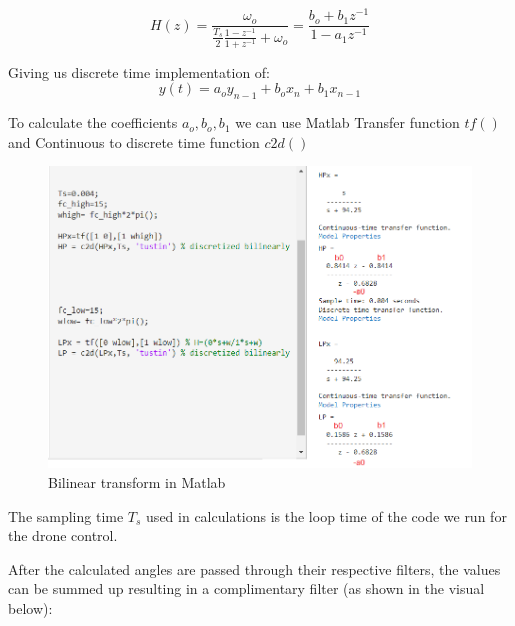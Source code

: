 \begin{displaymath}
    H(z)= \frac{\omega _o}{\frac{T_s}{2}\frac{1-z^{-1}}{1+z^{-1}} + \omega _o}=\frac{b_o + b_1z^{-1}}{1-a_1z^{-1}}
\end{displaymath}

Giving us discrete time implementation of:  
\begin{displaymath}
    y(t)=a_o y_{n-1}+b_ox_n+b_1x_{n-1}
\end{displaymath}

To calculate the coefficients $a_o, b_o, b_1$ we can use Matlab Transfer function $tf()$ and Continuous to discrete time function $c2d() $


\begin{figure}[H]
    \begin{center}
    \includegraphics[scale = 0.5]{pictures/IMU/filters_matlab.png}
    \end{center}
    \caption{Bilinear transform in Matlab}
    \label{fig:my_label}
\end{figure}



The sampling time $T_s$ used in calculations is the loop time of the code we run for the drone control.


After the calculated angles are passed through their respective filters, the values can be summed up resulting in a complimentary filter (as shown in the visual below):


